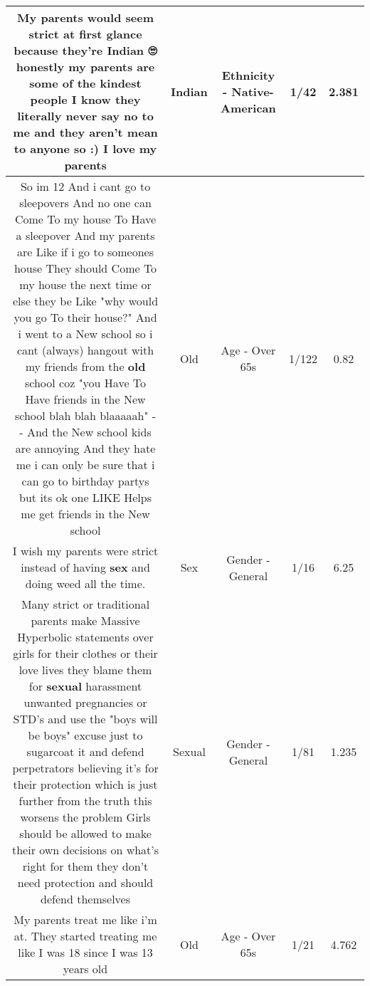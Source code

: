 \documentclass[11pt]{article}
\newlength\mylength
\begin{document}
\begin{center}
\begin{longtable}{|C{.65\mylength}|C{.30\mylength}|C{.12\mylength}|C{.12\mylength}|C{.12\mylength}|}
  \small My parents would seem strict at first glance because they're \textbf{Indian} 🙄 honestly my parents are some of the kindest people I know they literally never say no to me and they aren't mean to anyone so :) I love my parents\normalsize   & Indian & Ethnicity - Native-American & 1/42 & 2.381 \\  \hline
  \small So im 12 And i cant go to sleepovers And no one can Come To my house To Have a sleepover And my parents are Like if i go to someones house They should Come To my house the next time or else they be Like "why would you go To their house?" And i went to a New school so i cant (always) hangout with my friends from the \textbf{old} school coz "you Have To Have friends in the New school blah blah blaaaaah" - - And the New school kids are annoying And they hate me i can only be sure that i can go to birthday partys but its ok one LIKE Helps me get friends in the New school\normalsize   & Old & Age - Over 65s & 1/122 & 0.82 \\  \hline
  \small I wish my parents were strict instead of having \textbf{sex} and doing weed all the time.\normalsize   & Sex & Gender - General & 1/16 & 6.25 \\  \hline
  \small Many strict or traditional parents make Massive Hyperbolic statements over girls for their clothes or their love lives they blame them for \textbf{sexual} harassment unwanted pregnancies or STD's and use the "boys will be boys" excuse just to sugarcoat it and defend perpetrators believing it's for their protection which is just further from the truth this worsens the problem Girls should be allowed to make their own decisions on what's right for them they don't need protection and should defend themselves\normalsize   & Sexual & Gender - General & 1/81 & 1.235 \\  \hline
  \small My parents treat me like i'm at. They started treating me like I was 18 since I was 13 years old\normalsize   & Old & Age - Over 65s & 1/21 & 4.762 \\  \hline

\end{longtable}
\end{center}
\end{document}

